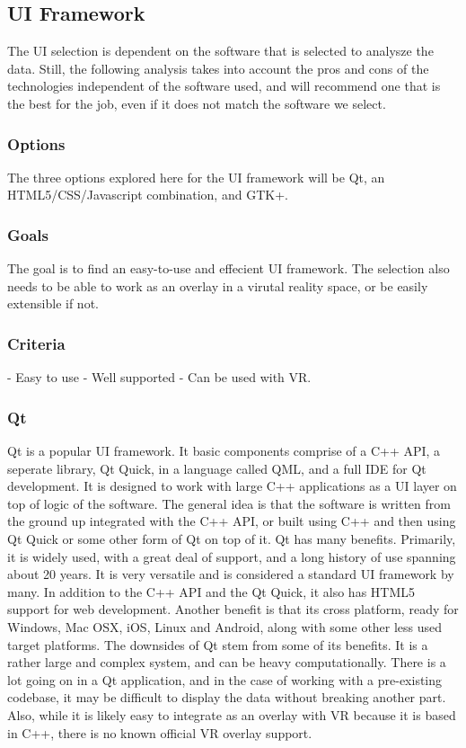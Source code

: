 \subsection{UI Framework}

The UI selection is dependent on the software that is selected to analysze the data. Still, the
following analysis takes into account the pros and cons of the technologies independent of the software
used, and will recommend one that is the best for the job, even if it does not match the software we 
select.

\subsubsection{Options}
The three options explored here for the UI framework will be Qt, an HTML5/CSS/Javascript combination,
and GTK+.

\subsubsection{Goals}
The goal is to find an easy-to-use and effecient UI framework. The selection
also needs to be able to work as an overlay in a virutal reality space, or be
easily extensible if not. 

\subsubsection{Criteria}
- Easy to use
- Well supported
- Can be used with VR.

\subsubsection{Qt}
Qt is a popular UI framework. It basic components comprise of a C++ API, a seperate library, Qt Quick,
in a language called QML, and a full IDE for Qt development. It is designed to work with large C++ applications
as a UI layer on top of logic of the software. The general idea is that the software is written from the ground
up integrated with the C++ API, or built using C++ and then using Qt Quick or some other form of Qt on top of 
it. Qt has many benefits. Primarily, it is widely used, with a great deal of support, and a long history of
use spanning about 20 years. It is very versatile and is considered a standard UI framework by many. In
addition to the C++ API and the Qt Quick, it also has HTML5 support for web development. Another benefit
is that its cross platform, ready for Windows, Mac OSX, iOS, Linux and Android, along with some other 
less used target platforms. The downsides of Qt stem from some of its benefits. It is a rather large
and complex system, and can be heavy computationally. There is a lot going on in a Qt application,
and in the case of working with a pre-existing codebase, it may be difficult to display the data
without breaking another part. Also, while it is likely easy to integrate as an overlay with VR
because it is based in C++, there is no known official VR overlay support. 

